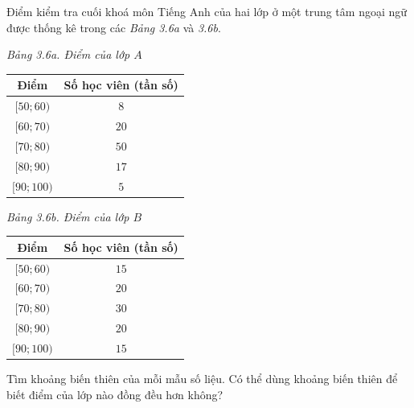 \begin{bt}[Mức độ 2]%
Điểm kiểm tra cuối khoá môn Tiếng Anh của hai lớp ở một trung tâm ngoại ngữ được thống kê trong các {\it Bảng 3.6a} và {\it 3.6b}.

\begin{minipage}{.5\textwidth}
	\begin{center}
		{\it Bảng 3.6a. Điểm của lớp $A$}\\
		\begin{tabular}{|c|c|}
			\hline Điểm & Số học viên (tần số) \\
			\hline $[50; 60)$ & $8$ \\
			\hline $[60; 70)$ & $20$\\
			\hline $[70; 80)$ & $50$\\
			\hline $[80; 90)$ & $17$\\
			\hline $[90; 100)$ & $5$ \\
			\hline
		\end{tabular}
	\end{center}
\end{minipage}
\begin{minipage}{.5\textwidth}
	\begin{center}
		{\it Bảng 3.6b. Điểm của lớp $B$}\\
		\begin{tabular}{|c|c|}
			\hline Điểm & Số học viên (tần số) \\
			\hline $[50; 60)$ & $15$\\
			\hline $[60; 70)$ & $20$\\
			\hline $[70; 80)$ & $30$\\
			\hline $[80; 90)$ & $20$\\
			\hline $[90; 100)$ & $15$\\
			\hline
		\end{tabular}
	\end{center}
\end{minipage}
Tìm khoảng biến thiên của mỗi mẫu số liệu. Có thể dùng khoảng biến thiên để biết điểm của lớp nào đồng đều hơn không?
\end{bt}

